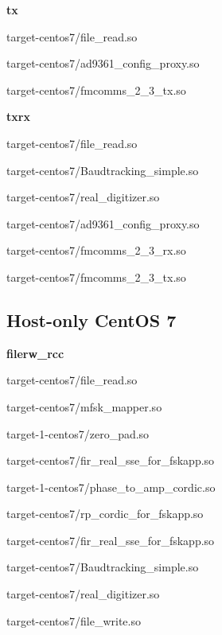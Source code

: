 \begin{appendices}
	\textbf{tx}
	\begin{itemize}
	\begin{minipage}[t]{.5\textwidth}
	\item target-centos7/file\_read.so
	\end{minipage}
	\begin{minipage}[t]{.5\textwidth}
	\item target-centos7/ad9361\_config\_proxy.so
	\item target-centos7/fmcomms\_2\_3\_tx.so
	\end{minipage}
	\end{itemize}

	\textbf{txrx} %
	\begin{itemize}
	\begin{minipage}[t]{.5\textwidth}
	\item target-centos7/file\_read.so
	\item target-centos7/Baudtracking\_simple.so
	\item target-centos7/real\_digitizer.so
	\end{minipage}
	\begin{minipage}[t]{.5\textwidth}
	\item target-centos7/ad9361\_config\_proxy.so
	\item target-centos7/fmcomms\_2\_3\_rx.so
	\item target-centos7/fmcomms\_2\_3\_tx.so
	\end{minipage}
	\end{itemize}

\pagebreak
\subsection{Host-only CentOS 7}
	\textbf{filerw\_rcc}
	\begin{itemize}
	\begin{minipage}[t]{.5\textwidth}
	\item target-centos7/file\_read.so
	\item target-centos7/mfsk\_mapper.so
	\item target-1-centos7/zero\_pad.so
	\item target-centos7/fir\_real\_sse\_for\_fskapp.so
	\item target-1-centos7/phase\_to\_amp\_cordic.so
	\end{minipage}
	\begin{minipage}[t]{.5\textwidth}
	\item target-centos7/rp\_cordic\_for\_fskapp.so
	\item target-centos7/fir\_real\_sse\_for\_fskapp.so
	\item target-centos7/Baudtracking\_simple.so
	\item target-centos7/real\_digitizer.so
	\item target-centos7/file\_write.so
	\end{minipage}
	\end{itemize}


\end{appendices}
